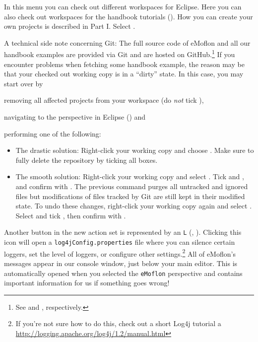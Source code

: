 \begin{stepbystep}
\item
In this menu you can check out different workspaces for Eclipse. 
Here you can also check out workspaces for the handbook tutorials ().
How you can create your own projects is described in Part I.
Select . 

A technical side note concerning Git:
The full source code of eMoflon and all our handbook examples are provided via Git and are hosted on GitHub.\footnote{See  and , respectively.}
If you encounter problems when fetching some handbook example, the reason may be that your checked out working copy is in a \enquote{dirty} state.
In this case, you may start over by 
\begin{inparaenum}[(i)]
\item removing all affected projects from your workspace (do \emph{not} tick ),
\item navigating to the  perspective in Eclipse () and
\item performing one of the following:
\end{inparaenum}
\begin{itemize}
\item The drastic solution:
Right-click your working copy \eMoflonExamplesRepo and choose .
Make sure to fully delete the repository by ticking all boxes.
\item The smooth solution:
Right-click your working copy \eMoflonExamplesRepo and select .
Tick  and , and confirm with .
The previous command purges all untracked and ignored files but modifications of files tracked by Git are still kept in their modified state.
To undo these changes, right-click your working copy again and select .
Select  and tick , then confirm with .
\end{itemize}


\item
Another button in the new action set is  represented by an \texttt{L} (\eMoflonConfigureLoggingIcon, ).
Clicking this icon will open a \texttt{log4jConfig\-.properties} file where you can silence certain loggers, set the level of loggers, or configure other
settings.\footnote{If you're not sure how to do this, check out a short Log4j tutorial a \url{http://logging.apache.org/log4j/1.2/manual.html}} All of eMoflon's
messages appear in our console window, just below your main editor. This is automatically opened when you selected the \texttt{eMoflon} perspective and
contains important information for us if something goes wrong!


\end{stepbystep}
